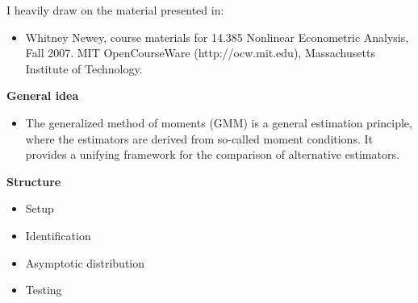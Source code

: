 \begin{frame} I heavily draw on the material presented in:

\begin{itemize}
\item Whitney Newey, course materials for 14.385 Nonlinear Econometric Analysis, Fall 2007. MIT OpenCourseWare
(http://ocw.mit.edu), Massachusetts Institute of Technology.
\end{itemize}

\end{frame}
\begin{frame}\textbf{General idea}\vspace{0.3cm}
\begin{itemize}\setlength\itemsep{1em}
\item The generalized method of moments (GMM) is a general estimation principle, where the estimators are derived from so-called  moment conditions. It provides a unifying framework for the comparison of alternative estimators.
\end{itemize}

\end{frame}
\begin{frame}\textbf{Structure}\vspace{0.3cm}

\begin{itemize}\setlength\itemsep{1em}
\item Setup
\item Identification
\item Asymptotic distribution
\item Testing
\end{itemize}
\end{frame}

